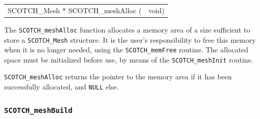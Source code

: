\begin{itemize}
\progsyn

{\tt\begin{tabular}{l@{}l}
SCOTCH\_Mesh * SCOTCH\_meshAlloc ( & void)
\end{tabular}}

\progdes

The {\tt SCOTCH\_meshAlloc} function allocates a memory area of a
size sufficient to store a {\tt SCOTCH\_\lbt Mesh} structure. It is
the user's responsibility to free this memory when it is no longer
needed, using the {\tt SCOTCH\_\lbt mem\lbt Free} routine. The
allocated space must be initialized before use, by means of the
{\tt SCOTCH\_\lbt mesh\lbt Init} routine.

\progret

{\tt SCOTCH\_meshAlloc} returns the pointer to the memory area if it
has been successfully allocated, and {\tt NULL} else.
\end{itemize}

\subsubsection{{\tt SCOTCH\_meshBuild}}

